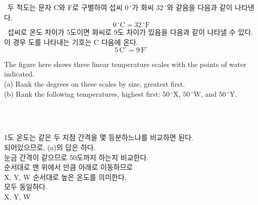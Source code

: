 \ 두 척도는 문자 C와 F로 구별하여 섭씨 $0\,^\circ$가 화씨 $32\,^\circ$와 같음을
다음과 같이 나타낸다.
\begin{equation*} 0\,^\circ\mathrm{C} = 32\,^\circ\mathrm{F} \end{equation*}
%
\ 섭씨로 온도 차이가 5도이면 화씨로 9도 차이가 있음을 다음과 같이 나타낼 수 있다.
이 경우 도를 나타내는 기호는 C 다음에 온다. \\
%
\begin{equation*} 5\,\mathrm{C}^\circ = 9\,\mathrm{F}^\circ \end{equation*}
\clearpage



\begin{checkbox}
The figure here shows three linear temperature scales with
the  points of water indicated. \\
(a) Rank the degrees on these scales by size, greatest first. \\
(b) Rank the following temperatures, highest
first: $50\,^\circ\mathrm{X}$, $50\,^\circ\mathrm{W}$, and $50\,^\circ\mathrm{Y}$.\\
%

\
\end{checkbox}

\begin{solbox}
\bnset
{} \\
\bn 1도 온도는 같은 두 지점 간격을 몇 등분하느냐를 비교하면 된다. \\
\bns {} 되어있으므로, (a)의 답은 하다.  \\
\bn 눈금 간격이 같으므로 50도까지 하는지 비교한다. \\
\bns 순서대로 맨 위에서  만큼 아래로 이동하므로 \\
\bns X, Y, W 순서대로 높은 온도를 의미한다.\\
%
 모두 동일하다. \\
 X, Y, W
\end{solbox}


